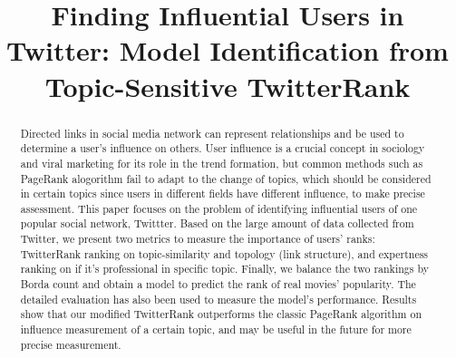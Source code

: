 \documentclass[conference]{IEEEtran}
\theoremstyle{definition}
\begin{document}
\title{Finding Influential Users in Twitter: Model Identification from Topic-Sensitive TwitterRank\\
} 
\author{
	\and
	\and
}

\maketitle

\begin{abstract}
Directed links in social media network can represent relationships and be used to determine a user's influence on others. User influence is a crucial concept in sociology and viral marketing for its role in the trend formation, but common methods such as PageRank alogorithm fail to adapt to the change of topics, which should be considered in certain topics since users in different fields have different influence, to make precise assessment. This paper focuses on the problem of identifying influential users of one popular social network, Twittter. Based on the large amount of data collected from Twitter, we present two metrics to measure the importance of users' ranks: TwitterRank ranking on topic-similarity and topology (link structure), and expertness ranking on if it's professional in specific topic. Finally, we balance the two rankings by Borda count and obtain a model to predict the rank of real movies' popularity. The detailed evaluation has also been used to measure the model's performance. Results show that our modified TwitterRank outperforms the classic PageRank algorithm on influence measurement of a certain topic, and may be useful in the future for more precise measurement.
\end{abstract}
\end{document}
